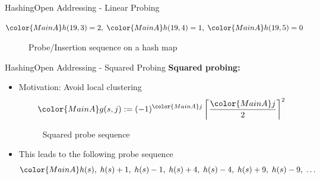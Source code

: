 \begin{frame}{Hashing}{Open Addressing - Linear Probing}
\begin{itemize}
\begin{math}
        {\color{MainA}h(19, 3)} = 2 ,\;
        {\color{MainA}h(19, 4)} = 1 ,\;
        {\color{MainA}h(19, 5)} = 0
      \end{math}
      \begin{figure}[!h]
        \def\LPEData{
          {19, {\color{green2}F}}/0,
          {15, {\color{green2}D}}/1,
          {2, {\color{green2}E}}/2,
          {5, {\color{green2}C}}/3,
          {53, {\color{green2}B}}/4,
          {12, {\color{green2}A}}/5,
          \relax/6
        }%
        \def\LPEShowIndex{0}%
        \begin{adjustbox}{width=0.75\linewidth}%
        \end{adjustbox}
        \vspace{-0.5em}%
        \caption{Probe/Insertion sequence on a hash map}%
        \label{fig:hashing:open_addressing:linear_probing_example7}%
      \end{figure}
  \end{itemize}
\end{frame}


\begin{frame}{Hashing}{Open Addressing - Squared Probing}
  \textbf{Squared probing:}
  \begin{itemize}
    \item<2->
      Motivation: Avoid local clustering
      \begin{displaymath}
        {\color{MainA}g(s,j)}
        := (-1)^{\color{MainA}j}
        \left\lceil \frac{{\color{MainA}j}}{2} \right\rceil^2
      \end{displaymath}
    \vspace{-2.0em}
  \begin{figure}[!h]
    \begin{adjustbox}{width=0.7\linewidth}%
    \end{adjustbox}
    \vspace{-1.0em}
    \caption{Squared probe sequence}%
    \label{fig:hashing:open_addressing:squared_probing}%
  \end{figure}
    \item<4->
      This leads to the following probe sequence
      \begin{displaymath}
        {\color{MainA}h(s) ,\;
        h(s)+1 ,\;
        h(s)-1 ,\;
        h(s)+4 ,\;
        h(s)-4 ,\;
        h(s)+9 ,\;
        h(s)-9 ,\;}
        \dotsc
      \end{displaymath}
  \end{itemize}
  \vspace{1.0em}
\end{frame}

